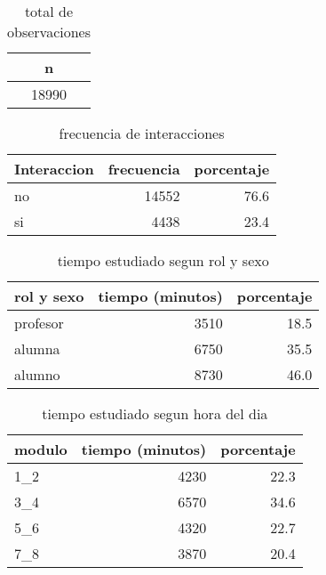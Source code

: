 \documentclass[spanish]{article}
\begin{document}
\begin{table}[h!]
\begin{center}
\begin{tabular}{|c|}
\hline
n    \\ \hline
18990\\ \hline
\end{tabular}
\caption{total de observaciones}
\end{center}
\end{table}

\begin{table}[h!]
\begin{center}
\begin{tabular}{|l|r|r|}
\hline
Interaccion & frecuencia & porcentaje   \\ \hline
no          &      14552 &          76.6\\ \hline
si          &       4438 &          23.4\\ \hline
\end{tabular}
\caption{frecuencia de interacciones}
\end{center}
\end{table}

\begin{table}[h!]
\begin{center}
\begin{tabular}{|l|r|r|}
\hline
rol y sexo & tiempo (minutos) & porcentaje   \\ \hline
profesor   &             3510 &          18.5\\ \hline
alumna     &             6750 &          35.5\\ \hline
alumno     &             8730 &          46.0\\ \hline
\end{tabular}
\caption{tiempo estudiado segun rol y sexo}
\end{center}
\end{table}

\begin{table}[h!]
\begin{center}
\begin{tabular}{|l|r|r|}
\hline
modulo & tiempo (minutos) & porcentaje   \\ \hline
1\_2    &             4230 &          22.3\\ \hline
3\_4    &             6570 &          34.6\\ \hline
5\_6    &             4320 &          22.7\\ \hline
7\_8    &             3870 &          20.4\\ \hline
\end{tabular}
\caption{tiempo estudiado segun hora del dia}
\end{center}
\end{table}
\end{document}
